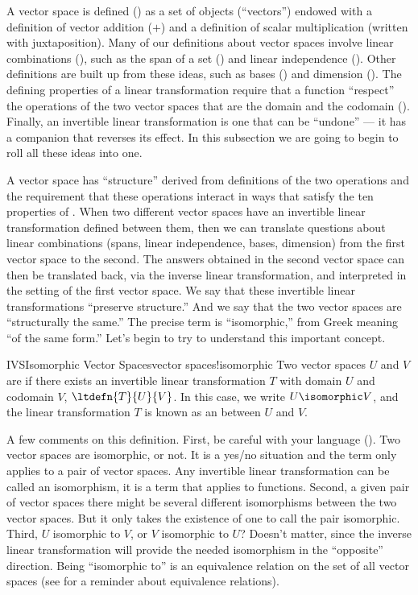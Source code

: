 A vector space is defined () as a set of objects (``vectors'') endowed with a definition of vector addition ($+$) and a definition of scalar multiplication (written with juxtaposition).  Many of our definitions about vector spaces involve linear combinations (), such as the span of a set () and linear independence ().  Other definitions are built up from these ideas, such as bases () and dimension ().  The defining properties of a linear transformation require that a function ``respect'' the operations of the two vector spaces that are the domain and the codomain ().  Finally, an invertible linear transformation is one that can be ``undone'' --- it has a companion that reverses its effect.  In this subsection we are going to begin to roll all these ideas into one.\par
%
A vector space has ``structure'' derived from definitions of the two operations and the requirement that these operations interact in ways that satisfy the ten properties of .  When two different vector spaces have an invertible linear transformation defined between them, then we can translate questions about linear combinations (spans, linear independence, bases, dimension) from the first vector space to the second.  The answers obtained in the second vector space can then be translated back, via the inverse linear transformation, and interpreted in the setting of the first vector space.  We say that these invertible linear transformations ``preserve structure.''  And we say that the two vector spaces are ``structurally the same.''  The precise term is ``isomorphic,'' from Greek meaning ``of the same form.''  Let's begin to try to understand this important concept.
%
\begin{definition}{IVS}{Isomorphic Vector Spaces}{vector spaces!isomorphic}
Two vector spaces $U$ and $V$ are  if there exists an invertible linear transformation $T$ with domain $U$ and codomain $V$, $\ltdefn{T}{U}{V}$.  In this case, we write $U\isomorphic V$, and the linear transformation $T$ is known as an  between $U$ and $V$.
\end{definition}
%
A few comments on this definition.  First, be careful with your language ().  Two vector spaces are isomorphic, or not.  It is a yes/no situation and the term only applies to a pair of vector spaces.  Any invertible linear transformation can be called an isomorphism, it is a term that applies to functions.  Second, a given pair of vector spaces there might be several different isomorphisms between the two vector spaces.  But it only takes the existence of one to call the pair isomorphic.  Third,  $U$ isomorphic to $V$, or $V$ isomorphic to $U$?  Doesn't matter, since the inverse linear transformation will provide the needed isomorphism in the ``opposite'' direction.  Being ``isomorphic to'' is an equivalence relation on the set of all vector spaces (see  for a reminder about equivalence relations).
